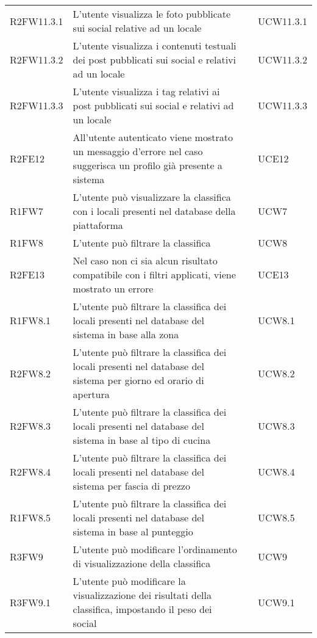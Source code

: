 \begin{longtable}{ m{}<{\centering}  m{}<{\centering}  m{}<{\centering}  m{}<{\centering}}
	R2FW11.3.1 & L’utente visualizza le foto pubblicate sui social relative ad un locale & \De & UCW11.3.1 \\
	R2FW11.3.2 & L’utente visualizza i contenuti testuali dei post pubblicati sui social e relativi ad un locale & \De & UCW11.3.2 \\
	R2FW11.3.3 & L’utente visualizza i tag relativi ai post pubblicati sui social e relativi ad un locale & \De & UCW11.3.3 \\
	 
	R2FE12 & All’utente autenticato viene mostrato un messaggio d’errore nel caso suggerisca un profilo già presente a sistema & \De & UCE12\\		
	 
	R1FW7 & L’utente può visualizzare la classifica con i locali presenti nel database della piattaforma & \Ob & UCW7\\	
	 
	R1FW8 & L’utente può filtrare la classifica & \Ob & UCW8\\		
	
	R2FE13 & Nel caso non ci sia alcun risultato compatibile con i filtri applicati, viene mostrato un errore & \De & UCE13\\	
	 
	R1FW8.1 & L’utente può filtrare la classifica dei locali presenti nel database del sistema in base alla zona & \Ob & UCW8.1\\	
	 
	R2FW8.2 & L’utente può filtrare la classifica dei locali presenti nel database del sistema per giorno ed orario di apertura & \De & UCW8.2\\	
	 
	R2FW8.3 & L’utente può filtrare la classifica dei locali presenti nel database del sistema in base al tipo di cucina & \De & UCW8.3\\	
	 
	R2FW8.4 & L’utente può filtrare la classifica dei locali presenti nel database del sistema per fascia di prezzo & \De & UCW8.4\\	 
	 
	R1FW8.5 & L’utente può filtrare la classifica dei locali presenti nel database del sistema in base al punteggio & \Ob & UCW8.5\\	 
	 
	R3FW9 & L’utente può modificare l’ordinamento di visualizzazione della classifica & \Fa & UCW9\\	
	 
	R3FW9.1 & L’utente può modificare la visualizzazione dei risultati della classifica, impostando il peso dei social & \Fa & UCW9.1\\	 
	 

\end{longtable}
